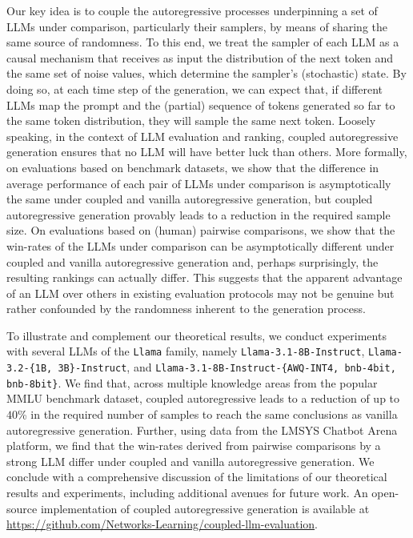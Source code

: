 %
Our key idea is to couple the autoregressive processes underpinning a set of LLMs under comparison, particularly their samplers, by means of sharing the same source of randomness. 
%
To this end, we treat the sampler of each LLM as a causal mechanism that receives as input the distribution of the next token and the same set of noise values, which determine the sampler'{}s (stochastic) state.
%
By doing so, at each time step of the generation, we can expect that, if different LLMs map the prompt and the (partial) sequence of tokens generated so far to the same token distribution, they will sample the same next token.
%
Loosely speaking, in the context of LLM evaluation and ranking, coupled autoregressive generation ensures that no LLM will have better luck than others.
%
More formally, on evaluations based on benchmark datasets, we show that the difference in average performance of each pair of LLMs under comparison is asymptotically the same under coupled and vanilla autoregressive generation, but coupled autoregressive generation provably leads to a reduction in the required sample size.
%
On evaluations based on (human) pairwise comparisons, we show that the win-rates of the LLMs under comparison can be asymptotically different under coupled and vanilla autoregressive generation and, perhaps surprisingly, the resulting rankings can actually differ.
%
This suggests that the apparent advantage of an LLM over others in existing evaluation protocols may not be genuine but rather confounded by the randomness inherent to the generation process.

%
To illustrate and complement our theoretical results, we conduct experiments with several LLMs of the \texttt{Llama} family, namely \texttt{Llama-3.1-8B-Instruct}, \texttt{Llama-3.2-\{1B, 3B\}-Instruct}, and \texttt{Llama-3.1-8B-Instruct-\{AWQ-INT4, bnb-4bit, bnb-8bit\}}.
%
% 
We find that, across multiple knowledge areas from the popular MMLU benchmark dataset, 
coupled autoregressive leads to a reduction of up to $40$\% in the required number of samples to reach the same conclusions as vanilla autoregressive generation.
%
%
Further, using data from the LMSYS Chatbot Arena platform, we find that the win-rates derived from pairwise comparisons by a strong LLM differ under coupled and vanilla autoregressive generation.
%
We conclude with a comprehensive discussion of the limitations of our theoretical results and experiments, including additional avenues for future work. An open-source implementation of coupled autoregressive generation is available at \url{https://github.com/Networks-Learning/coupled-llm-evaluation}.

